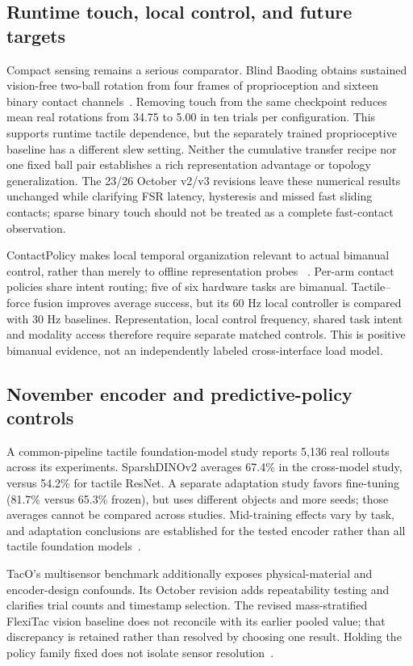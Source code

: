 \subsection{Runtime touch, local control, and future targets}

Compact sensing remains a serious comparator. Blind Baoding obtains sustained
vision-free two-ball rotation from four frames of proprioception and sixteen
binary contact channels~\cite{update2026blindbaoding}. Removing touch from the same
checkpoint reduces mean real rotations from 34.75 to 5.00 in ten trials per
configuration. This supports runtime tactile dependence, but the separately
trained proprioceptive baseline has a different slew setting. Neither the
cumulative transfer recipe nor one fixed ball pair establishes a rich
representation advantage or topology generalization.
The 23/26 October v2/v3 revisions leave these numerical results unchanged while
clarifying FSR latency, hysteresis and missed fast sliding contacts; sparse
binary touch should not be treated as a complete fast-contact observation.

ContactPolicy makes local temporal organization relevant to actual bimanual
control, rather than merely to offline representation probes
~\cite{update2026contactpolicy}. Per-arm contact policies share intent routing;
five of six hardware tasks are bimanual. Tactile--force fusion improves average
success, but its 60 Hz local controller is compared with 30 Hz baselines.
Representation, local control frequency, shared task intent and modality access
therefore require separate matched controls. This is positive bimanual evidence,
not an independently labeled cross-interface load model.


\subsection{November encoder and predictive-policy controls}

A common-pipeline tactile foundation-model study reports 5,136 real rollouts
across its experiments. SparshDINOv2 averages 67.4\% in the cross-model study,
versus 54.2\% for tactile ResNet. A separate adaptation study favors fine-tuning
(81.7\% versus 65.3\% frozen), but uses different objects and more seeds; those
averages cannot be compared across studies. Mid-training effects vary by task,
and adaptation conclusions are established for the tested encoder rather than
all tactile foundation models~\cite{nov2026tfm4il}.

TacO's multisensor benchmark additionally exposes physical-material and
encoder-design confounds. Its October revision adds repeatability testing and
clarifies trial counts and timestamp selection. The revised mass-stratified
FlexiTac vision baseline does not reconcile with its earlier pooled value;
that discrepancy is retained rather than resolved by choosing one result.
Holding the policy family fixed does not isolate sensor resolution~\cite{nov2026taco}.

